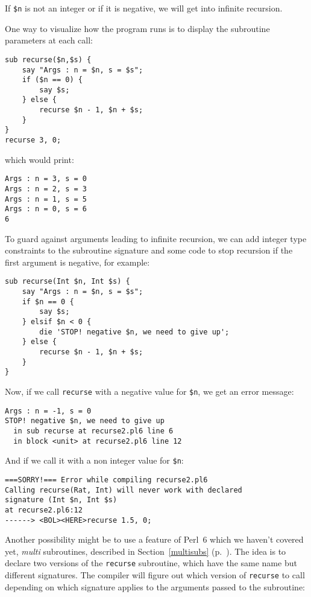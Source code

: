 If \verb'$n' is not an integer or if it is negative, we will get 
into infinite recursion.

One way to visualize how the program runs is to display 
the subroutine parameters at each call:

\begin{verbatim}
sub recurse($n,$s) {
    say "Args : n = $n, s = $s";
    if ($n == 0) {
        say $s;
    } else {
        recurse $n - 1, $n + $s;
    }
}
recurse 3, 0;
\end{verbatim}
which would print:
\begin{verbatim}
Args : n = 3, s = 0
Args : n = 2, s = 3
Args : n = 1, s = 5
Args : n = 0, s = 6
6
\end{verbatim}

To guard against arguments leading to infinite recursion, 
we can add integer type constraints to the subroutine 
signature and some code to stop recursion if the first 
argument is negative, for example:

\begin{verbatim}
sub recurse(Int $n, Int $s) {
    say "Args : n = $n, s = $s";
    if $n == 0 {
        say $s;
    } elsif $n < 0 {
        die 'STOP! negative $n, we need to give up';
    } else {
        recurse $n - 1, $n + $s;
    }
}
\end{verbatim}
%

Now, if we call {\tt recurse} with a negative value for 
\verb'$n', we get an error message:

\begin{verbatim}
Args : n = -1, s = 0
STOP! negative $n, we need to give up
  in sub recurse at recurse2.pl6 line 6
  in block <unit> at recurse2.pl6 line 12
\end{verbatim}
%

And if we call it with a non integer value for \verb'$n':

\begin{verbatim}
===SORRY!=== Error while compiling recurse2.pl6
Calling recurse(Rat, Int) will never work with declared
signature (Int $n, Int $s)
at recurse2.pl6:12
------> <BOL><HERE>recurse 1.5, 0;
\end{verbatim}
%

Another possibility might be to use a feature of Perl~6 which 
we haven't covered yet, \emph{multi} subroutines, described in 
Section~\ref{multisubs} (p.~\pageref{multisubs}). The idea is 
to declare two versions of the {\tt recurse} subroutine, 
which have the same name but different signatures. 
The compiler will figure out which version of {\tt recurse} 
to call depending on which signature applies to the 
arguments passed to the subroutine:

